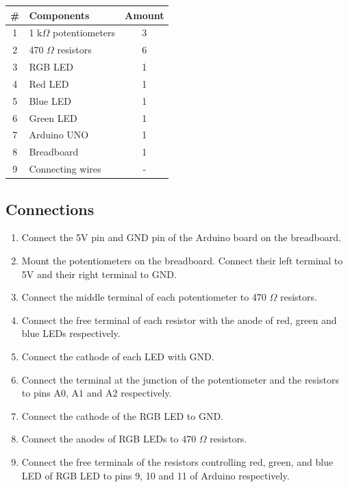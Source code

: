 \begin{table}[H]
    \centering
    \begin{tabular}{|c|l|c|}\hline
     \textbf{\#} & \textbf{Components}  &  \textbf{Amount}\\\hline
    1 & 1 k$\Omega$ potentiometers      & 3\\\hline
    2 & 470 $\Omega$ resistors          & 6\\\hline
    3 & RGB LED                         & 1\\\hline
    4 & Red LED                         & 1\\ \hline
    5 & Blue LED                        & 1\\\hline
    6 & Green LED                       & 1\\\hline
    7 & Arduino UNO                     & 1 \\\hline
    8 & Breadboard                      & 1 \\\hline
    9 & Connecting wires                & - \\\hline
    \end{tabular}
\end{table}

\subsection*{Connections}
\begin{enumerate}[leftmargin=*]
    \item Connect the 5V pin and GND pin of the Arduino board on the breadboard. 
    \item Mount the potentiometers on the breadboard. Connect their left terminal to 5V and their right terminal to GND. 
    \item Connect the middle terminal of each potentiometer to 470 $\Omega$ resistors. 
    \item Connect the free terminal of each resistor with the anode of red, green and blue LEDs respectively. 
    \item Connect the cathode of each LED with GND.
    \item Connect the terminal at the junction of the potentiometer and the resistors to pins A$0$, A$1$ and A$2$ respectively.
    \item Connect the cathode of the RGB LED to GND.
    \item Connect the anodes of RGB LEDs to 470 $\Omega$ resistors.
    \item Connect the free terminals of the resistors controlling red, green, and blue LED of RGB LED to pins 9, 10 and 11 of Arduino respectively. 
\end{enumerate}

